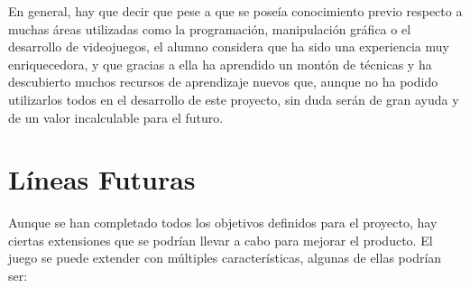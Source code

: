 	En general, hay que decir que pese a que se poseía conocimiento previo respecto a muchas áreas utilizadas como la programación, manipulación gráfica o el desarrollo de videojuegos, el alumno considera que ha sido una experiencia muy enriquecedora, y que gracias a ella ha aprendido un montón de técnicas y ha descubierto muchos recursos de aprendizaje nuevos que, aunque no ha podido utilizarlos todos en el desarrollo de este proyecto, sin duda serán de gran ayuda y de un valor incalculable para el futuro.

\section{Líneas Futuras}

	Aunque se han completado todos los objetivos definidos para el proyecto, hay ciertas extensiones que se podrían llevar a cabo para mejorar el producto. El juego se puede extender con múltiples características, algunas de ellas podrían ser:

	\begin{itemize}

		

	\end{itemize}
	